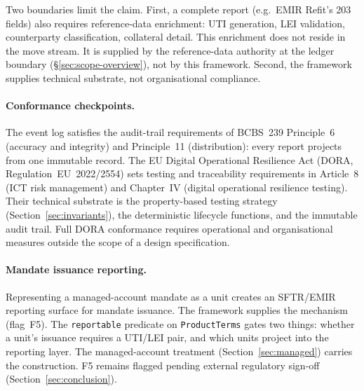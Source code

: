 Two boundaries limit the claim. First, a complete report (e.g.\ EMIR Refit's 203 fields) also requires reference-data enrichment: UTI generation, LEI validation, counterparty classification, collateral detail. This enrichment does not reside in the move stream. It is supplied by the reference-data authority at the ledger boundary (\S\ref{sec:scope-overview}), not by this framework. Second, the framework supplies technical substrate, not organisational compliance.

\paragraph{Conformance checkpoints.}
The event log satisfies the audit-trail requirements of BCBS~239 Principle~6 (accuracy and integrity) and Principle~11 (distribution): every report projects from one immutable record. The EU Digital Operational Resilience Act (DORA, Regulation~EU~2022/2554) sets testing and traceability requirements in Article~8 (ICT risk management) and Chapter~IV (digital operational resilience testing). Their technical substrate is the property-based testing strategy (Section~\ref{sec:invariants}), the deterministic lifecycle functions, and the immutable audit trail. Full DORA conformance requires operational and organisational measures outside the scope of a design specification.

\paragraph{Mandate issuance reporting.}
Representing a managed-account mandate as a unit creates an SFTR/EMIR reporting surface for mandate issuance. The framework supplies the mechanism (flag~F5). The \texttt{reportable} predicate on \texttt{ProductTerms} gates two things: whether a unit's issuance requires a UTI/LEI pair, and which units project into the reporting layer. The managed-account treatment (Section~\ref{sec:managed}) carries the construction. F5 remains flagged pending external regulatory sign-off (Section~\ref{sec:conclusion}).

\clearpage
